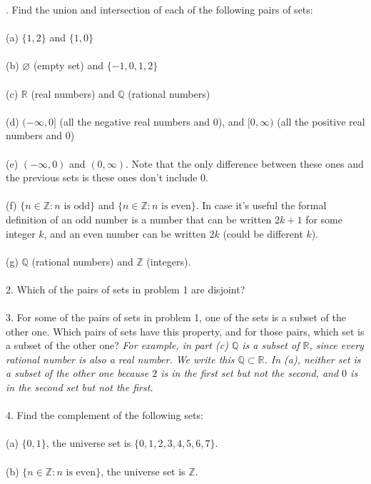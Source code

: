 \documentclass{article}
\newcommand{\R}{\mathbb{R}}
\newcommand{\Z}{\mathbb{Z}}
\newcommand{\Q}{\mathbb{Q}}
\begin{document}
. Find the union and intersection of each of the following pairs of sets: \\ \\
(a) $\{1,2\}$ and $\{1,0\}$
\\ \\
(b) $\varnothing$ (empty set) and $\{-1,0,1,2\}$
\\ \\
(c) $\R$ (real numbers) and $\Q$ (rational numbers)
\\ \\
(d) $(-\infty, 0]$ (all the negative real numbers and 0), and $[0,\infty)$ (all the positive real numbers and 0) \\ \\
(e) $(-\infty,0)$ and $(0, \infty)$. Note that the only difference between these ones and the previous sets is these ones don't include 0. 
\\ \\
(f) $\{n \in \Z: n \text{ is odd} \}$ and $\{n \in \Z: n \text{ is even}\}$. In case it's useful the formal definition of an odd number is a number that can be written $2k+1$ for some integer $k$, and an even number can be written $2k$ (could be different $k$).
\\ \\
(g) $\Q$ (rational numbers) and $\Z$ (integers). \\ \\
2. Which of the pairs of sets in problem 1 are disjoint? \\ \\
3. For some of the pairs of sets in problem 1, one of the sets is a subset of the other one. Which pairs of sets have this property, and for those pairs, which set is a subset of the other one? \textit{For example, in part (c) $\Q$ is a subset of $\R$, since every rational number is also a real number. We write this $\Q \subset \R$. In (a), neither set is a subset of the other one because $2$ is in the first set but not the second, and $0$ is in the second set but not the first. } \\ \\
4. Find the complement of the following sets: \\ \\
(a) $\{0,1\}$, the universe set is $\{0,1,2,3,4,5,6,7\}$. \\ \\
(b) $\{ n \in \Z : n \text{ is even}\}$, the universe set is $\Z$.
\\ \\
\end{document}

